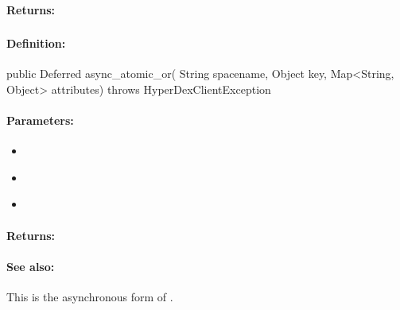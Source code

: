 \paragraph{Returns:}


\pagebreak
\subsubsection{}
\label{api:java:async_atomic_or}


\paragraph{Definition:}
\begin{javacode}
public Deferred async_atomic_or(
        String spacename,
        Object key,
        Map<String, Object> attributes) throws HyperDexClientException
\end{javacode}

\paragraph{Parameters:}
\begin{itemize}[noitemsep]
\item {}\\

\item {}\\

\item {}\\

\end{itemize}

\paragraph{Returns:}


\paragraph{See also:}  This is the asynchronous form of .

\pagebreak
